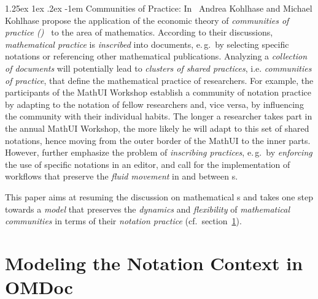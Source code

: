\documentclass[pdftex,bibtotocnumbered,idxtotoc,11pt]{scrartcl}
\makeatletter
\renewcommand\paragraph{\@startsection{paragraph}{4}{\z@}%
{1.25ex \@plus1ex \@minus.2ex}%
{-1em}%
{\setlength{\parfillskip}{\z@ \@plus 1fil}%
\raggedsection\normalfont\sectfont\nobreak
\size@paragraph\nobreak}}
\makeatother
\begin{document}
\paragraph{Communities of Practice:}
In~\cite{KohKoh:copmem06} Andrea Kohlhase and Michael Kohlhase propose the application of
the economic theory of {\emph{communities of practice ({\cop})}}~\cite{Wen05} to the area
of mathematics. According to their discussions, {\emph{mathematical practice}} is
{\emph{inscribed}} into documents, e.\,g.\ by selecting specific notations or referencing
other mathematical publications. Analyzing a {\emph{collection of documents}} will
potentially lead to {\emph{clusters of shared practices}}, i.e. {\emph{communities of
    practice}}, that define the mathematical practice of researchers. For example, the
participants of the MathUI Workshop establish a community of notation practice by adapting
to the notation of fellow researchers and, vice versa, by influencing the community with
their individual habits. The longer a researcher takes part in the annual MathUI Workshop,
the more likely he will adapt to this set of shared notations, hence moving from the outer
border of the MathUI {\cop} to the inner parts. However, \cite{KohKoh:copmem06} further
emphasize the problem of {\emph{inscribing practices}}, e.\,g.\ by {\emph{enforcing}} the
use of specific notations in an editor, and call for the implementation of workflows that
preserve the {\emph{fluid movement}} in and between {\cop}s.

This paper aims at resuming the discussion on mathematical {\cop}s and takes one step
towards a {\emph{{\cop} model}} that preserves the {\emph{dynamics}} and
{\emph{flexibility}} of {\emph{mathematical communities}} in terms of their
{\emph{notation practice}} (cf.\ section~\ref{sec:docmodel}).


\section{Modeling the Notation Context in OMDoc}\label{sec:docmodel}
\end{document}

